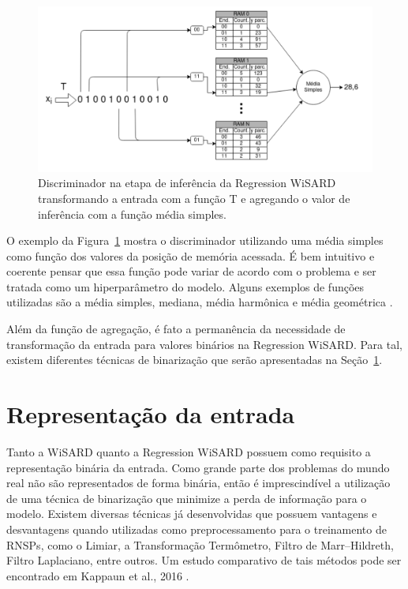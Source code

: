 \begin{figure}[!ht]
    \centering
    \includegraphics[width=5.0in]{img/rew_regression.pdf}
    \caption{Discriminador na etapa de inferência da Regression WiSARD transformando a entrada com a função T e agregando o valor de inferência com a função média simples.}
    \label{fig:rew_discr}
\end{figure}

O exemplo da Figura~\ref{fig:rew_discr} mostra o discriminador utilizando uma média simples como função dos valores da posição de memória acessada. É bem intuitivo e coerente pensar que essa função pode variar de acordo com o problema e ser tratada como um hiperparâmetro do modelo. Alguns exemplos de funções utilizadas são a média simples, mediana, média harmônica e média geométrica \cite{rew}.

Além da função de agregação, é fato a permanência da necessidade de transformação da entrada para valores binários na Regression WiSARD. Para tal, existem diferentes técnicas de binarização que serão apresentadas na Seção~\ref{sec:input_repr}.

\section{Representação da entrada} \label{sec:input_repr}
Tanto a WiSARD quanto a Regression WiSARD possuem como requisito a representação binária da entrada. Como grande parte dos problemas do mundo real não são representados de forma binária, então é imprescindível a utilização de uma técnica de binarização que minimize a perda de informação para o modelo. Existem diversas técnicas já desenvolvidas que possuem vantagens e desvantagens quando utilizadas como preprocessamento para o treinamento de RNSPs, como o Limiar, a Transformação Termômetro, Filtro de Marr–Hildreth, Filtro Laplaciano, entre outros. Um estudo comparativo de tais métodos pode ser encontrado em Kappaun et al., 2016 \cite{binenctec}.


